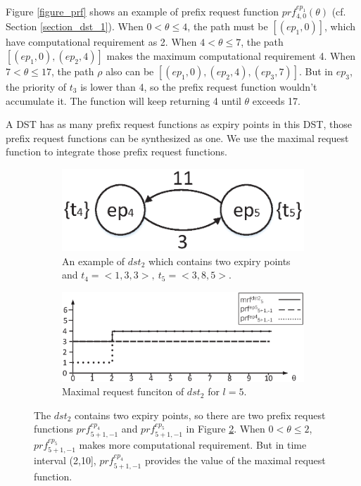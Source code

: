 \documentclass[conference]{IEEEtran}
\begin{document}
Figure \ref{figure_prf} shows an example of prefix request function $prf^{ep_1}_{4,0}(\theta)$ (cf. Section \ref{section_dst_1}). When $0<\theta\leq4$, the path must be $[(ep_1,0)]$, which have computational requirement as 2. When $4<\theta\leq7$, the path $[(ep_1,0),(ep_2,4)]$ makes the maximum computational requirement 4. When $7<\theta\leq17$, the path $\rho$ also can be $[(ep_1,0),(ep_2,4),(ep_3,7)]$. But in $ep_3$, the priority of $t_3$ is lower than 4, so the prefix request function wouldn't accumulate it. The function will keep returning 4 until $\theta$ exceeds 17.

A DST has as many prefix request functions as expiry points in this DST, those prefix request functions can be synthesized as one. We use the maximal request function to integrate those prefix request functions.
\begin{figure}
  \centering
  \begin{subfigure}[t]{3.25in}
    \centering
    \includegraphics[scale=.45]{graphics/figure_dst2.eps}
    \caption{An example of $dst_2$ which contains two expiry points and $t_4=<1,3,3>,\ t_5=<3,8,5>$.}\label{figure_dst2}
  \end{subfigure}
  \quad
  \begin{subfigure}[t]{3.25in}
    \centering
    \includegraphics[scale=.325]{graphics/figure_mrf.eps}
    \caption{Maximal request funciton of $dst_2$ for $l=5$.}\label{figure_mrf}
  \end{subfigure}
  \caption{The $dst_2$ contains two expiry points, so there are two prefix request functions $prf^{ep_4}_{5+1,-1}$ and $prf^{ep_5}_{5+1,-1}$ in Figure \ref{figure_mrf}. When $0<\theta\leq2$, $prf^{ep_5}_{5+1,-1}$ makes more computational requirement. But in time interval (2,10], $prf^{ep_4}_{5+1,-1}$ provides the value of the maximal request function.}\label{figure_dst2_mrf}
\end{figure}
\end{document}
